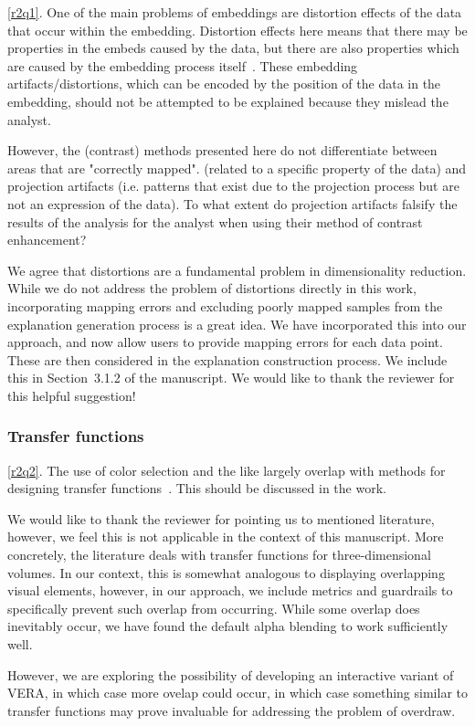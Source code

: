 \documentclass{article}
\newcounter{rtaskno}
\newcommand{\rtask}[1]{\refstepcounter{rtaskno}\label{#1}}
\newcommand{\reviewc}[2]{\begin{leftbar}\noindent\rtask{#1}\ref{#1}. #2\end{leftbar}}
\newcommand{\answer}[1]{\noindent #1\\[0mm]}
\newlength{\leftbarwidth}
\newlength{\leftbarsep}
\renewenvironment{leftbar}{%
    \def\FrameCommand{{\color{black}{\vrule width \leftbarwidth\relax\hspace {\leftbarsep}}}}%
    \MakeFramed {\advance \hsize -\width \FrameRestore }%
}{\endMakeFramed}
\begin{document}
\reviewc{r2q1}{
One of the main problems of embeddings are distortion effects of the data that occur within the embedding. Distortion effects here means that there may be properties in the embeds caused by the data, but there are also properties which are caused by the embedding process itself~\citep{Lehmann2013,Lehmann2016}. These embedding artifacts/distortions, which can be encoded by the position of the data in the embedding, should not be attempted to be explained because they mislead the analyst.

However, the (contrast) methods presented here do not differentiate between areas that are "correctly mapped". (related to a specific property of the data) and projection artifacts (i.e. patterns that exist due to the projection process but are not an expression of the data). To what extent do projection artifacts falsify the results of the analysis for the analyst when using their method of contrast enhancement?}

\answer{We agree that distortions are a fundamental problem in dimensionality reduction. While we do not address the problem of distortions directly in this work, incorporating mapping errors and excluding poorly mapped samples from the explanation generation process is a great idea. We have incorporated this into our approach, and now allow users to provide mapping errors for each data point. These are then considered in the explanation construction process. We include this in Section~3.1.2 of the manuscript. We would like to thank the reviewer for this helpful suggestion!}
   
\subsubsection*{Transfer functions}

\reviewc{r2q2}{The use of color selection and the like largely overlap with methods for designing transfer functions~\citep{Wang2012}. This should be discussed in the work.}

\answer{We would like to thank the reviewer for pointing us to mentioned literature, however, we feel this is not applicable in the context of this manuscript. More concretely, the literature deals with transfer functions for three-dimensional volumes. In our context, this is somewhat analogous to displaying overlapping visual elements, however, in our approach, we include metrics and guardrails to specifically prevent such overlap from occurring. While some overlap does inevitably occur, we have found the default alpha blending to work sufficiently well.

However, we are exploring the possibility of developing an interactive variant of VERA, in which case more ovelap could occur, in which case something similar to transfer functions may prove invaluable for addressing the problem of overdraw.}
\end{document}
